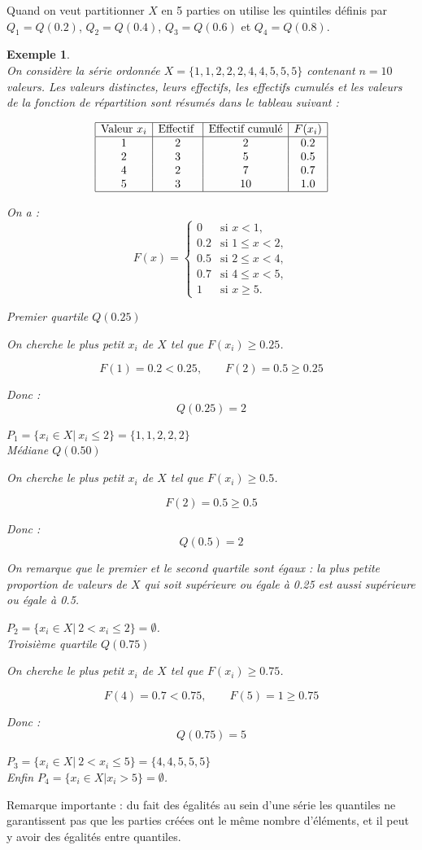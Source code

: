 \documentclass[a4paper, 12]{article}
\newtheorem{ex}{Exemple}
\newcommand\set[1]{\ensuremath{\{#1\}}}
\begin{document}
Quand on veut partitionner $X$ en 5 parties on utilise les quintiles définis par 
$Q_1 = Q(0.2)$, $Q_2 = Q(0.4)$, $Q_3 = Q(0.6)$ et $Q_4 = Q(0.8)$. 

\begin{ex} \ \\
On considère la série ordonnée $X = \set{1,1,2,2,2,4,4,5,5,5}$ contenant $n=10$ valeurs.
Les valeurs distinctes, leurs  effectifs, les effectifs cumulés et les valeurs de la fonction de répartition sont résumés dans le tableau suivant :

\[
\begin{array}{|c|c|c|c|}
\hline
\text{Valeur } x_i & \text{Effectif } & \text{Effectif cumulé} & F(x_i) \\
\hline
1 & 2 & 2    & 0.2 \\
2 & 3 & 5   & 0.5 \\
4 & 2 & 7  & 0.7 \\
5 & 3 &10 & 1.0 \\
\hline
\end{array}
\]

On a :
\[
F(x) =
\begin{cases}
0 & \text{si } x < 1, \\[4pt]
0.2 & \text{si } 1 \le x < 2, \\[4pt]
0.5 & \text{si } 2 \le x < 4, \\[4pt]
0.7 & \text{si } 4 \le x < 5, \\[4pt]
1 & \text{si } x \ge 5.
\end{cases}
\]


Premier quartile $Q(0.25)$ 

On cherche le plus petit $x_i$ de $X$ tel que $F(x_i) \ge 0.25$.

\[
F(1) = 0.2 < 0.25, \qquad
F(2) = 0.5 \ge 0.25
\]

Donc :
\[
\boxed{Q(0.25) = 2}
\]

$P_1 = 	\set{x_i \in X   | \ x_i \le 2} = \set{1,1,2,2,2}$
\\

Médiane $Q(0.50)$ 

   On cherche le plus petit $x_i$ de $X$ tel que $F(x_i) \ge 0.5$.

\[
F(2) = 0.5 \ge 0.5
\]

Donc :
\[
\boxed{Q(0.5) = 2}
\]

On remarque que le premier et le second quartile sont égaux : la plus petite proportion de valeurs de $X$ qui soit supérieure ou égale à 0.25  est aussi supérieure ou égale à 0.5.

$P_2 = \set{x_i \in X   | \ 2 < x_i \le 2} = \emptyset$. \\

 
Troisième quartile $Q(0.75)$

On cherche le plus petit $x_i$ de $X$ tel que $F(x_i) \ge 0.75$.

\[
F(4) = 0.7 < 0.75, \qquad
F(5) = 1 \ge 0.75
\]

Donc :
\[
\boxed{Q(0.75) = 5}
\]

$P_3 = 	\set{x_i \in X   | \ 2 < x_i \le 5} = \set{4,4,5,5,5}$\\

 
 Enfin $P_4 =  \set{x_i \in X   | x_i > 5} = \emptyset$.
 \end{ex}


Remarque importante : du fait des égalités au sein d’une série les quantiles ne garantissent pas que les parties créées ont le même nombre d’éléments, et il peut y avoir des égalités entre quantiles.
\end{document}
